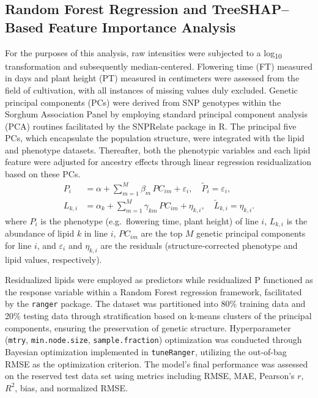 \documentclass[10pt,letterpaper]{article}
\begin{document}
\subsection*{Random Forest Regression and TreeSHAP–Based Feature Importance Analysis}
For the purposes of this analysis, raw intensities were subjected to a log\textsubscript{10} transformation and subsequently median-centered. Flowering time (FT) measured in days and plant height (PT) measured in centimeters were assessed from the field of cultivation, with all instances of missing values duly excluded. Genetic principal components (PCs) were derived from SNP genotypes within the Sorghum Association Panel by employing standard principal component analysis (PCA) routines facilitated by the SNPRelate package in R. The principal five PCs, which encapsulate the population structure, were integrated with the lipid and phenotype datasets. Thereafter, both the phenotypic variables and each lipid feature were adjusted for ancestry effects through linear regression residualization based on these PCs.\[
\begin{aligned}
P_i &= \alpha + \sum_{m=1}^{M} \beta_m\,PC_{i m} + \varepsilon_i,
\quad \widetilde{P}_i = \varepsilon_i,\\
L_{k,i} &= \alpha_k + \sum_{m=1}^{M} \gamma_{k m}\,PC_{i m} + \eta_{k,i},
\quad \widetilde{L}_{k,i} = \eta_{k,i}.
\end{aligned}
\]
where \(P_i\) is the phenotype (e.g.\ flowering time, plant height) of line \(i\), 
\(L_{k,i}\) is the abundance of lipid \(k\) in line \(i\), 
\(PC_{i m}\) are the top \(M\) genetic principal components for line \(i\), 
and \(\varepsilon_i\) and \(\eta_{k,i}\) are the residuals (structure‑corrected phenotype and lipid values, respectively).


Residualized lipids were employed as predictors while residualized P functioned as the response variable within a Random Forest regression framework, facilitated by the \texttt{ranger} package. The dataset was partitioned into 80\% training data and 20\% testing data through stratification based on k-means clusters of the principal components, ensuring the preservation of genetic structure. Hyperparameter (\texttt{mtry}, \texttt{min.node.size}, \texttt{sample.fraction}) optimization was conducted through Bayesian optimization implemented in \texttt{tuneRanger}, utilizing the out-of-bag RMSE as the optimization criterion. The model's final performance was assessed on the reserved test data set using metrics including RMSE, MAE, Pearson’s $r$, $R^2$, bias, and normalized RMSE.
\end{document}
